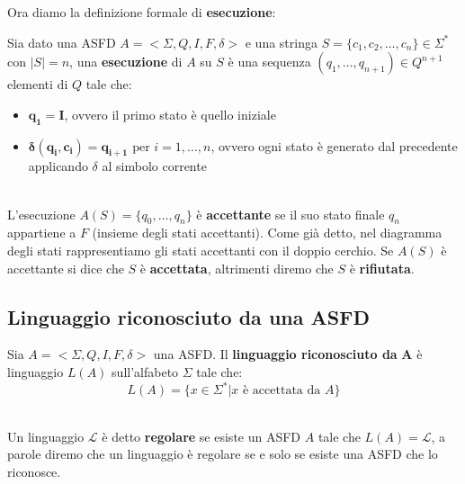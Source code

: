 Ora diamo la definizione formale di \textbf{esecuzione}:\smallskip\\
\colorbox{SALZO}{\parbox{\dimexpr\linewidth-2\fboxsep}{\begin{definition}
   Sia dato una ASFD $A = <\Sigma, Q, I,F,\delta>$ e una stringa $S = \{ c_1,c_2,\dots,c_n  \} \in \Sigma^*$ con $|S| = n$, una \textbf{esecuzione} di $A$ su $S$ è una sequenza
   $(q_1,\dots,q_{n+1}) \in Q^{n+1}$ elementi di $Q$ tale che:
   \begin{itemize}
    \item $\bm{q_1 = I}$, ovvero il primo stato è quello iniziale
    \item $\bm{\delta(q_i,c_i) = q_{i+1}} \text{ per } i = 1,\dots, n$, ovvero ogni stato è generato dal precedente applicando $\delta$ al simbolo corrente

   \end{itemize}

\end{definition}}}\smallskip\\
L'esecuzione $A(S) = \{ q_0,\dots,q_n  \}$ è \textbf{accettante} se il suo stato finale $q_n$ appartiene a $F$ (insieme degli stati accettanti). Come già detto, nel diagramma degli stati
rappresentiamo gli stati accettanti con il doppio cerchio. Se $A(S)$ è accettante si dice che $S$ è \textbf{accettata}, altrimenti diremo che $S$ è \textbf{rifiutata}.


\subsection{Linguaggio riconosciuto da una ASFD}\label{linguaggio}
\colorbox{SALZO}{\parbox{\dimexpr\linewidth-2\fboxsep}{\begin{definition}
   Sia $A = <\Sigma, Q, I,F,\delta>$ una ASFD. Il \textbf{linguaggio riconosciuto da} $\bm{A}$ è linguaggio $L(A)$ sull'alfabeto $\Sigma$ tale che:
   \[  L(A) = \{  x \in \Sigma^* | x \text{ è accettata da } A  \}  \]
\end{definition}}}\smallskip\\
Un linguaggio $\mathcal{L}$ è detto \textbf{regolare} \label{regolare} se esiste un ASFD $A$ tale che $L(A) = \mathcal{L}$, a parole diremo che un linguaggio è regolare se e solo se esiste una 
ASFD che lo riconosce.


\newpage

